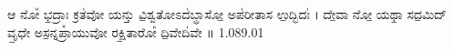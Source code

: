 \documentclass{article}
\begin{document}
ಆ ನೋ᳚ ಭ॒ದ್ರಾಃ ಕ್ರತ॑ವೋ ಯನ್ತು ವಿ॒ಶ್ವತೋಽದ॑ಬ್ಧಾಸೋ॒ ಅಪ॑ರೀತಾಸ ಉ॒ದ್ಭಿದಃ॑ ।
ದೇ॒ವಾ ನೋ॒ ಯಥಾ॒ ಸದ॒ಮಿದ್ ವೃ॒ಧೇ ಅಸ॒ನ್ನಪ್ರಾ᳚ಯುವೋ ರಕ್ಷಿ॒ತಾರೋ᳚ ದಿ॒ವೇದಿ॑ವೇ ॥ 1.089.01
\end{document}
